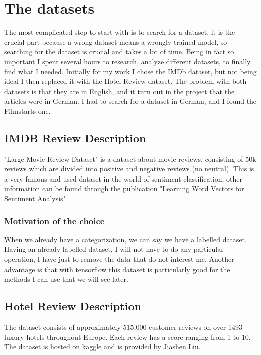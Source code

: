 \section{The \gls{dataset}s}
\label{chap:dataset}
The most complicated step to start with is to search for a dataset, it is the crucial part because a wrong dataset means a wrongly trained model, so searching for the dataset is crucial and takes a lot of time.
Being in fact so important I spent several hours to research, analyze different datasets, to finally find what I needed.
Initially for my work I chose the IMDb dataset, but not being ideal I then replaced it with the Hotel Review dataset. The problem with both datasets is that they are in English, and it turn out in the project that the articles were in German. I had to search for a dataset in German, and I found the Filmstarts one.

\subsection{IMDB Review Description}
"Large Movie Review Dataset" \cite{noauthor_sentiment_nodate} is a dataset about movie reviews, consisting of 50k reviews which are divided into positive and negative reviews (no neutral).
This is a very famous and used dataset in the world of sentiment classification, other information can be found through the publication "Learning Word Vectors for Sentiment Analysis" \cite{maas-EtAl:2011:ACL-HLT2011}.

\subsubsection*{Motivation of the choice}
When we already have a categorization, we can say we have a labelled dataset.
Having an already labelled dataset, I will not have to do any particular operation, I have just to remove the data that do not interest me. Another advantage is that with tensorflow this dataset is particularly good for the methods I can use that we will see later.

\subsection{Hotel Review Description}
The dataset consists of approximately 515,000 customer reviews on over 1493 luxury hotels throughout Europe. Each review has a score ranging from 1 to 10. The dataset \cite{515k_kaggle} is hosted on \gls{kaggle} and is provided by Jiashen Liu.

